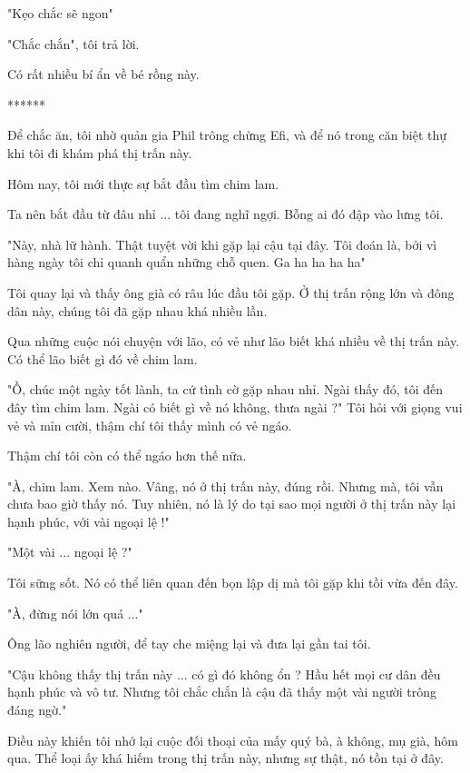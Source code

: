 "Kẹo chắc sẽ ngon"

"Chắc chắn", tôi trả lời.

Có rất nhiều bí ẩn về bé rồng này. \\

\begin{center}
	******
\end{center}


Để chắc ăn, tôi nhờ quản gia Phil trông chừng Efi, và để nó trong căn biệt thự khi tôi đi khám phá thị trấn này.

Hôm nay, tôi mới thực sự bắt đầu tìm chim lam.

Ta nên bắt đầu từ đâu nhỉ ... tôi đang nghĩ ngợi. Bỗng ai đó đập vào lưng tôi.

"Này, nhà lữ hành. Thật tuyệt vời khi gặp lại cậu tại đây. Tôi đoán là, bởi vì hàng ngày tôi chỉ quanh quẩn những chỗ quen. Ga ha ha ha ha"

Tôi quay lại và thấy ông già có râu lúc đầu tôi gặp. Ở thị trấn rộng lớn và đông dân này, chúng tôi đã gặp nhau khá nhiều lần.

Qua những cuộc nói chuyện với lão, có vẻ như lão biết khá nhiều về thị trấn này. Có thể lão biết gì đó về chim lam.

"Ồ, chúc một ngày tốt lành, ta cứ tình cờ gặp nhau nhỉ. Ngài thấy đó, tôi đến đây tìm chim lam. Ngài có biết gì về nó không, thưa ngài ?" Tôi hỏi với giọng vui vẻ và mỉn cười, thậm chí tôi thấy mình có vẻ ngáo.

Thậm chí tôi còn có thể ngáo hơn thế nữa.

"À, chim lam. Xem nào. Vâng, nó ở thị trấn này, đúng rồi. Nhưng mà, tôi vẫn chưa bao giờ thấy nó. Tuy nhiên, nó là lý do tại sao mọi người ở thị trấn này lại hạnh phúc, với vài ngoại lệ !"

"Một vài ... ngoại lệ ?"

Tôi sững sốt. Nó có thể liên quan đến bọn lập dị mà tôi gặp khi tồi vừa đến đây.

"À, đừng nói lớn quá ..."

Ông lão nghiên người, để tay che miệng lại và đưa lại gần tai tôi.

"Cậu không thấy thị trấn này ... có gì đó không ổn ? Hầu hết mọi cư dân đều hạnh phúc và vô tư. Nhưng tôi chắc chắn là cậu đã thấy một vài người trông đáng ngờ."

Điều này khiến tôi nhớ lại cuộc đối thoại của mấy quý bà, à không, mụ già, hôm qua. Thể loại ấy khá hiếm trong thị trấn này, nhưng sự thật, nó tồn tại ở đây.


